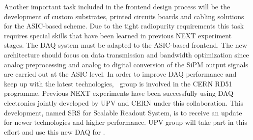 Another important task included in the frontend design process will be the development of custom substrates, printed circuits boards and cabling solutions for the ASIC-based scheme. Due to the tight radiopurity requirements this task requires special skills that have been learned in previous NEXT experiment stages.
The DAQ system must be adapted to the ASIC-based frontend. The new architecture should focus on data transmission and bandwidth optimization since analog preprocessing and analog to digital conversion of the SiPM output signals are carried out at the ASIC level. In order to improve DAQ performance and keep up with the latest technologies, \sUPV\ group is involved in the CERN RD51 programme. Previous NEXT experiments have been successfully using DAQ electronics jointly developed by UPV and CERN under this collaboration. This development, named SRS for Scalable Readout System, is to receive an update for newer technologies and higher performance. UPV group will take part in this effort and use this new DAQ for \NHD.




